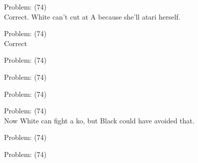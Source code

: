 \documentclass[11pt]{article}
\begin{document}
\begin{minipage}[t]{0.5\textwidth}
  {\centering
  
Problem: (74)\\
Correct. White can't cut at A because she'll atari herself.\\
  }
\end{minipage}
\begin{minipage}[t]{0.5\textwidth}
  {\centering
  
Problem: (74)\\
Correct\\
  }
\end{minipage}
\begin{minipage}[t]{0.5\textwidth}
  {\centering
  
Problem: (74)\\
  }
\end{minipage}
\begin{minipage}[t]{0.5\textwidth}
  {\centering
  
Problem: (74)\\
  }
\end{minipage}
\begin{minipage}[t]{0.5\textwidth}
  {\centering
  
Problem: (74)\\
  }
\end{minipage}
\begin{minipage}[t]{0.5\textwidth}
  {\centering
  
Problem: (74)\\
Now White can fight a ko, but Black could have avoided that.\\
  }
\end{minipage}
\begin{minipage}[t]{0.5\textwidth}
  {\centering
  
Problem: (74)\\
  }
\end{minipage}
\begin{minipage}[t]{0.5\textwidth}
  {\centering
  
Problem: (74)\\
  }
\end{minipage}
\end{document}
